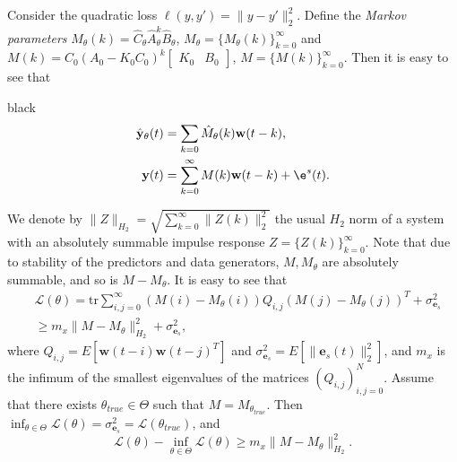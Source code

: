 \documentclass{ifacconf}
\def\rve{{\mathbf{e}}}
\def\rvw{{\mathbf{w}}}
\def\rvy{{\mathbf{y}}}
\begin{document}
  Consider the quadratic loss $\ell(y,y')=\|y-y'\|_2^2$. 
  Define the \emph{Markov parameters} $M_{\theta}(k)=\hat{C}_{\theta}\hat{A}_\theta^k\hat{B}_\theta$,
  $M_{\theta}=\{M_{\theta}(k)\}_{k=0}^{\infty}$
  and $M(k)=C_0(A_0-K_0C_0)^k\begin{bmatrix} K_0 & B_0 \end{bmatrix}$, $M=\{M(k)\}_{k=0}^{\infty}$.
   Then it is easy to see that
   \begin{color}{black}
  \[ 
   \begin{aligned}
     \hat{\rvy}_{\theta}(t)&=\sum_{k=0} \hat{M}_{\theta}(k)\rvw(t-k), \\
     \rvy(t)&=\sum_{k=0}^{\infty} M(k)\rvw(t-k) +\e^s(t).
   \end{aligned}
  \]
     \end{color}
  We denote by  $\|Z\|_{H_2}=\sqrt{\sum_{k=0}^{\infty}\|Z(k)\|_2^2}$ the usual $H_2$ norm of a system with an absolutely summable impulse response $Z=\{Z(k)\}_{k=0}^{\infty}$. Note that due to stability of the predictors and data generators, 
   $M,M_{\theta}$ are absolutely summable, and so is $M-M_{\theta}$.
   It is easy to see that 
  \[ 
    \begin{split}
     & \mathcal{L}(\theta)=\mathrm{tr}\sum_{i,j=0}^{\infty} (M(i)-M_{\theta}(i))Q_{i,j}(M(j)-M_{\theta}(j))^T+ \sigma_{\rve_s}^2   \\
     & \ge m_x \|M-M_{\theta}\|_{H_2}^2 + \sigma_{\rve_s}^2,
    \end{split}
  \]
  where $Q_{i,j}=E[\rvw(t-i)\rvw(t-j)^T]$ and $\sigma_{\rve_s}^2=E[\|\rve_s(t)\|_2^2]$, and 
  $m_x$ is the infimum of the smallest eigenvalues of the matrices $(Q_{i,j})_{i,j=0}^{N}$. 
  Assume that there exists $\theta_{true} \in \Theta$ such that $M=M_{\theta_{true}}$.
  Then $\inf_{\theta \in \Theta} \mathcal{L}(\theta) = \sigma_{\rve_s}^2=\mathcal{L}(\theta_{true})$, and 
  \[ \mathcal{L}(\theta)-\inf_{\theta \in \Theta} \mathcal{L}(\theta) \ge m_x \|M-M_{\theta}\|_{H_2}^2. \]
\end{document}
